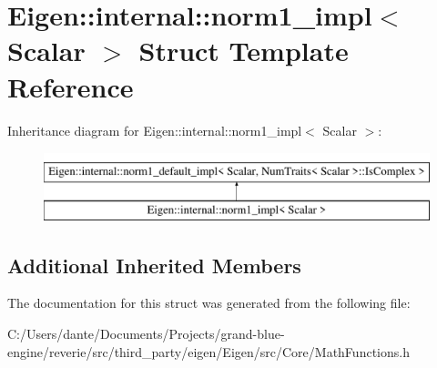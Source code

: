 \hypertarget{struct_eigen_1_1internal_1_1norm1__impl}{}\section{Eigen\+::internal\+::norm1\+\_\+impl$<$ Scalar $>$ Struct Template Reference}
\label{struct_eigen_1_1internal_1_1norm1__impl}
Inheritance diagram for Eigen\+::internal\+::norm1\+\_\+impl$<$ Scalar $>$\+:\begin{figure}[H]
\begin{center}
\leavevmode
\includegraphics[height=2.000000cm]{struct_eigen_1_1internal_1_1norm1__impl}
\end{center}
\end{figure}
\subsection*{Additional Inherited Members}


The documentation for this struct was generated from the following file\+:\begin{DoxyCompactItemize}
\item 
C\+:/\+Users/dante/\+Documents/\+Projects/grand-\/blue-\/engine/reverie/src/third\+\_\+party/eigen/\+Eigen/src/\+Core/Math\+Functions.\+h\end{DoxyCompactItemize}
